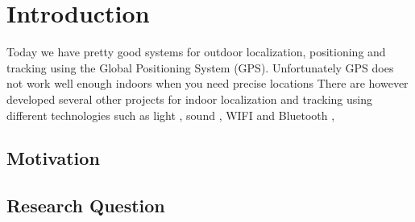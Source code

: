 \documentclass[../Main/thesis.tex]{subfiles}
\begin{document}
\chapter{Introduction}
\label{ch:introduction}

Today we have pretty good systems for outdoor localization, positioning and tracking using the Global Positioning System (GPS). 
Unfortunately GPS does not work well enough indoors when you need precise locations
There are however developed several other projects for indoor localization and tracking using different technologies such as light \citep{xiaohan2010improved}, sound \citep{schweinzer2010ultrasonic}, WIFI  \citep{chang2010robust} and Bluetooth , 


\section{Motivation}



\section{Research Question}
\end{document}
